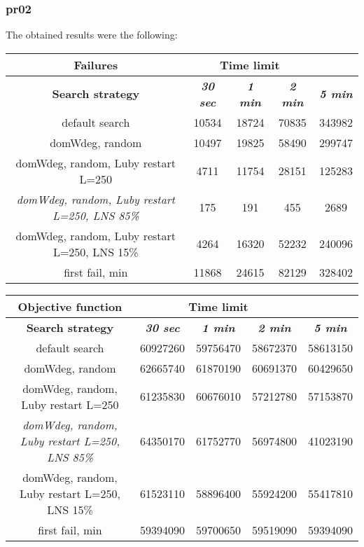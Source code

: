 \subsubsection{pr02}
The obtained results were the following:
{
\renewcommand{\arraystretch}{2}
\begin{longtable}[h]{| c | c | c | c | c |}
    \hline
    \textbf{Failures} & \multicolumn{3}{c}{Time limit} & \\
    \hline
    \textbf{Search strategy} & \textbf{\textit{30 sec}} & \textbf{\textit{1 min}} & \textbf{\textit{2 min}} & \textbf{\textit{5 min}} \\
    \hline
    \endhead
    default search                                         & 10534 & 18724 & 70835 & 343982 \\
    \hline
    domWdeg, random                                        & 10497 & 19825 & 58490 & 299747 \\
    \hline
    domWdeg, random, Luby restart L=250                    &  4711 & 11754 & 28151 & 125283 \\
    \hline
    \textit{domWdeg, random, Luby restart L=250, LNS 85\%} &   175 &   191 &   455 &   2689 \\
    \hline
    domWdeg, random, Luby restart L=250, LNS 15\%          &  4264 & 16320 & 52232 & 240096 \\
    \hline
    first fail, min                                        & 11868 & 24615 & 82129 & 328402 \\
    \hline
\end{longtable}
}

{
\renewcommand{\arraystretch}{2}
\begin{longtable}[h]{| c | c | c | c | c |}
    \hline
    \textbf{Objective function} & \multicolumn{3}{c}{Time limit} & \\
    \hline
    \textbf{Search strategy} & \textbf{\textit{30 sec}} & \textbf{\textit{1 min}} & \textbf{\textit{2 min}} & \textbf{\textit{5 min}} \\
    \hline
    \endhead
    default search                                         & 60927260 & 59756470 & 58672370 & 58613150 \\
    \hline
    domWdeg, random                                        & 62665740 & 61870190 & 60691370 & 60429650 \\
    \hline
    domWdeg, random, Luby restart L=250                    & 61235830 & 60676010 & 57212780 & 57153870 \\
    \hline
    \textit{domWdeg, random, Luby restart L=250, LNS 85\%} & 64350170 & 61752770 & 56974800 & 41023190 \\
    \hline
    domWdeg, random, Luby restart L=250, LNS 15\%          & 61523110 & 58896400 & 55924200 & 55417810 \\
    \hline
    first fail, min                                        & 59394090 & 59700650 & 59519090 & 59394090 \\
    \hline
\end{longtable}
}

